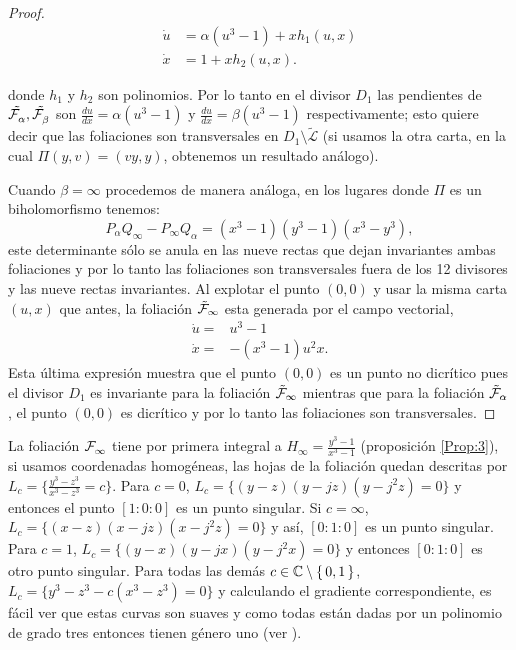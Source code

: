 \begin{proof}
\begin{align*}
\dot{u}&= \alpha(u^{3}-1) + xh_{1}(u,x)\\
\dot{x}&= 1 + xh_{2}(u,x).
\end{align*}  

\noindent donde $h_{1}$ y $h_{2}$ son polinomios. Por lo tanto en el divisor $D_{1}$ las pendientes de $\tilde{\mathcal{F}^{\ }_{\alpha}},\tilde{\mathcal{F}^{\ }_{\beta}}$ son $\tfrac{du}{dx}=\alpha(u^{3}-1)$ y $\tfrac{du}{dx}=\beta(u^{3}-1)$ respectivamente; esto quiere decir que las foliaciones son transversales en $D_{1}\setminus\tilde{\mathcal{L}}$ (si usamos la otra carta, en la cual $\Pi(y,v)=(vy,y)$, obtenemos un resultado análogo).

\noindent Cuando $\beta=\infty$ procedemos de manera análoga, en los lugares donde $\Pi$ es un biholomorfismo tenemos:
\begin{equation*}
P_{\alpha}Q_{\infty}-P_{\infty}Q_{\alpha}=(x^{3}-1)(y^{3}-1)(x^{3}-y^{3}),
\end{equation*}
\noindent este determinante sólo se anula en las nueve rectas que dejan invariantes ambas foliaciones y por lo tanto las foliaciones son transversales fuera de los 12 divisores y las nueve rectas invariantes. Al explotar el punto $(0,0)$ y usar la misma carta $(u,x)$ que antes, la foliación $\tilde{\mathcal{F}}_{\infty}$ esta generada por el campo vectorial,
\begin{align*}
\dot{u}=&u^{3}-1\\
\dot{x}=&-(x^{3}-1)u^{2}x.
\end{align*}
\noindent Esta última expresión muestra que el punto $(0,0)$ es un punto no dicrítico pues el divisor $D_{1}$ es invariante para la foliación $\tilde{\mathcal{F}}_{\infty}$ mientras que para la foliación $\tilde{\mathcal{F}}_{\alpha}$, el punto $(0,0)$ es dicrítico y por lo tanto las foliaciones son transversales. 
\end{proof}


La foliación $\mathcal{F}^{\ }_{\infty}$ tiene por primera integral a $H_{\infty}=\tfrac{y^{3}-1}{x^{3}-1}$ (proposición \ref{Prop:3}), si usamos coordenadas homogéneas, las hojas de la foliación quedan descritas por $L_{c}=\{\tfrac{y^{3}-z^{3}}{x^{3}-z^{3}}=c\}$. Para $c=0$, $L_{c}=\{(y-z)(y-jz)(y-j^{2}z)=0\}$ y entonces el punto $[1:0:0]$ es un punto singular. Si $c=\infty$, $L_{c}=\{(x-z)(x-jz)(x-j^{2}z)=0\}$ y así, $[0:1:0]$ es un punto singular. Para $c=1$, $L_{c}=\{(y-x)(y-jx)(y-j^{2}x)=0\}$ y entonces $[0:1:0]$ es otro punto singular. Para todas las demás $c\in\mathbb{C}\setminus\{\, 0,1\, \}$, $L_{c}=\{y^{3}-z^{3}-c(x^{3}-z^{3})=0\}$ y calculando el gradiente correspondiente, es fácil ver que estas curvas son suaves y como todas están dadas por un polinomio de grado tres entonces tienen género uno (ver \cite{FischerGerd}).\\

